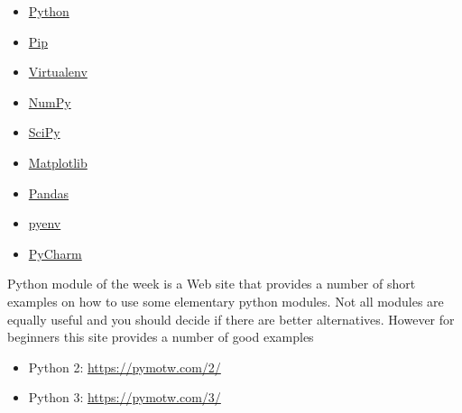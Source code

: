 \begin{itemize}
\tightlist
\item
  \href{https://www.python.org/}{Python}
\item
  \href{https://pip.pypa.io/en/stable/}{Pip}
\item
  \href{https://virtualenv.pypa.io/en/stable/}{Virtualenv}
\item
  \href{http://www.numpy.org/}{NumPy}
\item
  \href{https://scipy.org/}{SciPy}
\item
  \href{http://matplotlib.org/}{Matplotlib}
\item
  \href{http://pandas.pydata.org/}{Pandas}
\item
  \href{https://github.com/pyenv/pyenv}{pyenv}
\item
  \href{https://github.com/pyenv/pyenv}{PyCharm}
\end{itemize}

Python module of the week is a Web site that provides a number of short
examples on how to use some elementary python modules. Not all modules
are equally useful and you should decide if there are better
alternatives. However for beginners this site provides a number of good
examples

\begin{itemize}
\tightlist
\item
  Python 2: \url{https://pymotw.com/2/}
\item
  Python 3: \url{https://pymotw.com/3/}
\end{itemize}
